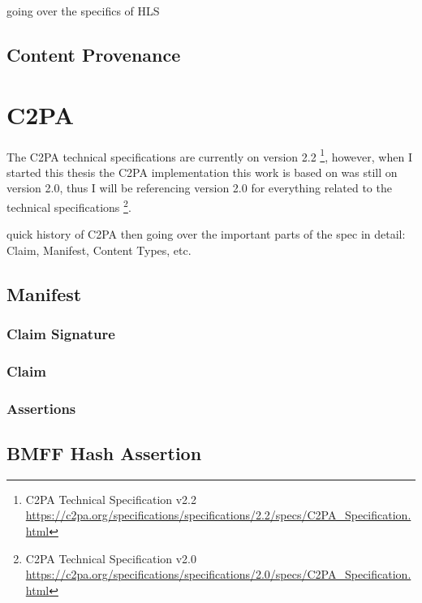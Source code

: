 going over the specifics of HLS

\subsection{Content Provenance\label{sec:conpro}}

\section{C2PA\label{c2pa}}

The C2PA technical specifications are currently on version 2.2 \footnote{C2PA Technical Specification v2.2 \url{https://c2pa.org/specifications/specifications/2.2/specs/C2PA_Specification.html}}, however, when I started this thesis the C2PA implementation this work is based on was still on version 2.0, thus I will be referencing version 2.0 for everything related to the technical specifications \footnote{C2PA Technical Specification v2.0 \url{https://c2pa.org/specifications/specifications/2.0/specs/C2PA_Specification.html}}.

quick history of C2PA then going over the important parts of the spec in detail: Claim, Manifest, Content Types, etc.

\subsection{Manifest}

\subsubsection{Claim Signature}

\subsubsection{Claim}

\subsubsection{Assertions}

\subsection{BMFF Hash Assertion\label{sec:bmff_assertion}}

